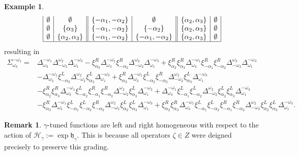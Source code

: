 \documentclass[a4paper]{amsart}
\theoremstyle{definition}
\newtheorem{remark}[theorem]{Remark}
\newtheorem{example}[theorem]{Example}
\newcommand{\mfh}{\mathfrak{h}}
\newcommand{\mcH}{\mathcal{H}}
\begin{document}
\begin{example}
\[\begin{array}{|c|c||c|c||c|c|}
      \emptyset & \emptyset             & \{-\alpha_1,-\alpha_2\} & \emptyset               & \{\alpha_2,\alpha_3\} & \emptyset \\
      \emptyset & \{\alpha_3\}          & \{-\alpha_1,-\alpha_2\} & \{-\alpha_2\}           & \{\alpha_2,\alpha_3\} & \emptyset \\
      \emptyset & \{\alpha_2,\alpha_3\} & \{-\alpha_1,-\alpha_2\} & \{-\alpha_1,-\alpha_2\} & \{\alpha_2,\alpha_3\} & \emptyset \\
      \hline
    \end{array}
  \]
  resulting in 
  \begin{align*}
    \Sigma_{\omega_3}^{-\omega_1}
    = &
    \Delta_{\omega_3}^{-\omega_1} \Delta_{-\omega_2}^{\omega_2} \Delta_{\omega_1}^{-\omega_3}
    -
    \xi_{\alpha_3}^R\Delta_{\omega_3}^{-\omega_1} \xi_{-\alpha_2}^R\Delta_{-\omega_2}^{\omega_2} \Delta_{\omega_1}^{-\omega_3}
    +
    \xi_{\alpha_2}^R\xi_{\alpha_3}^R\Delta_{\omega_3}^{-\omega_1} \xi_{-\alpha_1}^R\xi_{-\alpha_2}^R\Delta_{-\omega_2}^{\omega_2} \Delta_{\omega_1}^{-\omega_3}
    \\
    &-
    \Delta_{\omega_3}^{-\omega_1} \xi_{-\alpha_2}^L\Delta_{-\omega_2}^{\omega_2} \xi_{\alpha_3}^L\Delta_{\omega_1}^{-\omega_3}
    +
    \xi_{\alpha_3}^R\Delta_{\omega_3}^{-\omega_1} \xi_{-\alpha_2}^L\xi_{-\alpha_2}^R\Delta_{-\omega_2}^{\omega_2} \xi_{\alpha_3}^L\Delta_{\omega_1}^{-\omega_3}
    \\
    &-
    \xi_{\alpha_2}^R\xi_{\alpha_3}^R\Delta_{\omega_3}^{-\omega_1} \xi_{-\alpha_2}^L\xi_{-\alpha_1}^R\xi_{-\alpha_2}^R\Delta_{-\omega_2}^{\omega_2} \xi_{\alpha_3}^L\Delta_{\omega_1}^{-\omega_3}
    +
    \Delta_{\omega_3}^{-\omega_1} \xi_{-\alpha_1}^L\xi_{-\alpha_2}^L\Delta_{-\omega_2}^{\omega_2} \xi_{\alpha_2}^L\xi_{\alpha_3}^L\Delta_{\omega_1}^{-\omega_3}
    \\
    &-
    \xi_{\alpha_3}^R\Delta_{\omega_3}^{-\omega_1} \xi_{-\alpha_1}^L\xi_{-\alpha_2}^L\xi_{-\alpha_2}^R\Delta_{-\omega_2}^{\omega_2} \xi_{\alpha_2}^L\xi_{\alpha_3}^L\Delta_{\omega_1}^{-\omega_3}
    +
    \xi_{\alpha_2}^R\xi_{\alpha_3}^R\Delta_{\omega_3}^{-\omega_1} \xi_{-\alpha_1}^L\xi_{-\alpha_2}^L\xi_{-\alpha_1}^R\xi_{-\alpha_2}^R\Delta_{-\omega_2}^{\omega_2} \xi_{\alpha_2}^L\xi_{\alpha_3}^L\Delta_{\omega_1}^{-\omega_3}
    .
  \end{align*}
\end{example}

\begin{remark}
  $\gamma$-tuned functions are left and right homogeneous with respect to the action of $\mcH_\gamma:=\exp\mfh_\gamma$.
  This is because all operators $\zeta\in Z$ were deigned precisely to preserve this grading.
\end{remark}
\end{document}
